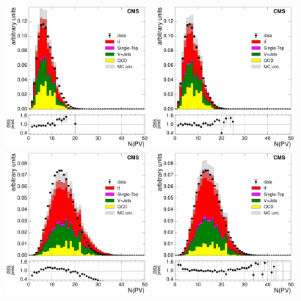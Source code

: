 \begin{figure}[hbtp]
    \centering
      \includegraphics[width=0.48\textwidth]{Chapters/04_Analysis/04b_XSections/images/control_plots/before_fit/7TeV/EPlusJets_nVertex__with_ratio}\hfill
      \includegraphics[width=0.48\textwidth]{Chapters/04_Analysis/04b_XSections/images/control_plots/before_fit/7TeV/EPlusJets_nVertex_reweighted__with_ratio}\\
      \includegraphics[width=0.48\textwidth]{Chapters/04_Analysis/04b_XSections/images/control_plots/before_fit/8TeV/EPlusJets_nVertex__with_ratio}\hfill
      \includegraphics[width=0.48\textwidth]{Chapters/04_Analysis/04b_XSections/images/control_plots/before_fit/8TeV/EPlusJets_nVertex_reweighted__with_ratio}\\

\end{figure}
